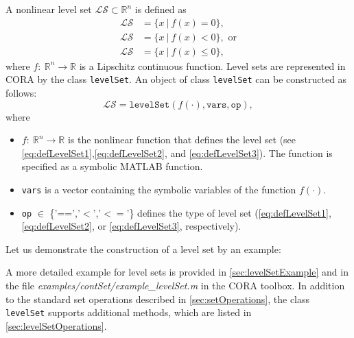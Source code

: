  \label{sec:levelSet}

A nonlinear level set $\mathcal{LS} \subset \mathbb{R}^n$ is defined as
\begin{align}
	\label{eq:defLevelSet1}
	\mathcal{LS} &= \{ x ~ | ~ f(x) = 0 \}, \\
	\label{eq:defLevelSet2}
	\mathcal{LS} &= \{ x ~ | ~ f(x) < 0 \}, \text{ or} \\
	\label{eq:defLevelSet3}
	\mathcal{LS} &= \{ x ~ | ~ f(x) \leq 0 \},
\end{align}
where $f:~\mathbb{R}^n \to \mathbb{R}$ is a Lipschitz continuous function. Level sets are represented in CORA by the class \texttt{levelSet}. An object of class \texttt{levelSet} can be constructed as follows:
\begin{equation*}
	\mathcal{LS} = \texttt{levelSet}(f(\cdot),\texttt{vars},\texttt{op}),
\end{equation*} 
where
\begin{itemize}
	\item $f:~\mathbb{R}^n \to \mathbb{R}$ is the nonlinear function that defines the level set (see \eqref{eq:defLevelSet1},\eqref{eq:defLevelSet2}, and \eqref{eq:defLevelSet3}). The function is specified as a symbolic MATLAB function.
	\item \texttt{vars} is a vector containing the symbolic variables of the function $f(\cdot)$.
	\item \texttt{op} $\in$ \{'==','$<$','$<=$'\} defines the type of level set (\eqref{eq:defLevelSet1},\eqref{eq:defLevelSet2}, or \eqref{eq:defLevelSet3}, respectively).
\end{itemize}

Let us demonstrate the construction of a level set by an example:

\begin{center}
\begin{minipage}[t]{0.45\textwidth}
	\vspace{20pt}
	\footnotesize
	
\end{minipage}
\begin{minipage}[t]{0.3\textwidth}
	\vspace{0pt}
	\centering
\end{minipage}
\end{center}

A more detailed example for level sets is provided in \cref{sec:levelSetExample} and in the file \textit{examples/contSet/example\_levelSet.m} in the CORA toolbox.  In addition to the standard set operations described in \cref{sec:setOperations}, the class \texttt{levelSet} supports additional methods, which are listed in \cref{sec:levelSetOperations}.